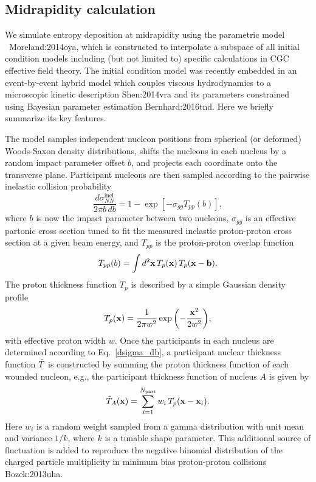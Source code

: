 \subsection{Midrapidity calculation}
We simulate entropy deposition at midrapidity using the parametric model \trento\ {Moreland:2014oya}, which is constructed to interpolate a subspace of all initial condition models including (but not limited to) specific calculations in CGC effective field theory.
The initial condition model was recently embedded in an event-by-event hybrid model which couples viscous hydrodynamics to a microscopic kinetic description {Shen:2014vra} and its parameters constrained using Bayesian parameter estimation {Bernhard:2016tnd}.
Here we briefly summarize its key features.

The model samples independent nucleon positions from spherical (or deformed) Woods-Saxon density distributions, shifts the nucleons in each nucleus by a random impact parameter offset $b$, and projects each coordinate onto the transverse plane.
Participant nucleons are then sampled according to the pairwise inelastic collision probability
\begin{equation}
  \label{dsigma_db}
  \dfrac{d\sigma_{NN}^\text{inel}}{2\pi b\, db} = 1 - \exp\left[-\sigma_{gg} T_{pp}(b)\right],
\end{equation}
where $b$ is now the impact parameter between two nucleons, $\sigma_{gg}$ is an effective partonic cross section tuned to fit the measured inelastic proton-proton cross section at a given beam energy, and $T_{pp}$ is the proton-proton overlap function
\begin{equation}
  T_{pp}(b) = \int d^2\mathbf x\, T_p(\mathbf x)\,T_p(\mathbf x - \mathbf b).
\end{equation}
The proton thickness function $T_p$ is described by a simple Gaussian density profile
\begin{equation}
  T_p(\mathbf x) = \frac{1}{2 \pi w^2} \exp\bigg({-}\frac{\mathbf x^2}{2 w^2}\bigg),
  \label{nucleon_profile}
\end{equation}
with effective proton width $w$.
Once the participants in each nucleus are determined according to Eq.~\eqref{dsigma_db}, a participant nuclear thickness function $\tilde{T}$ is constructed by summing the proton thickness function of each wounded nucleon, e.g., the participant thickness function of nucleus $A$ is given by
\begin{equation}
  \tilde{T}_A(\mathbf x) = \sum\limits_{i=1}^{N_\text{part}} w_i\, T_p(\mathbf x - \mathbf x_i).
\end{equation}
Here $w_i$ is a random weight sampled from a gamma distribution with unit mean and variance $1/k$, where $k$ is a tunable shape parameter.
This additional source of fluctuation is added to reproduce the negative binomial distribution of the charged particle multiplicity in minimum bias proton-proton collisions {Bozek:2013uha}.

